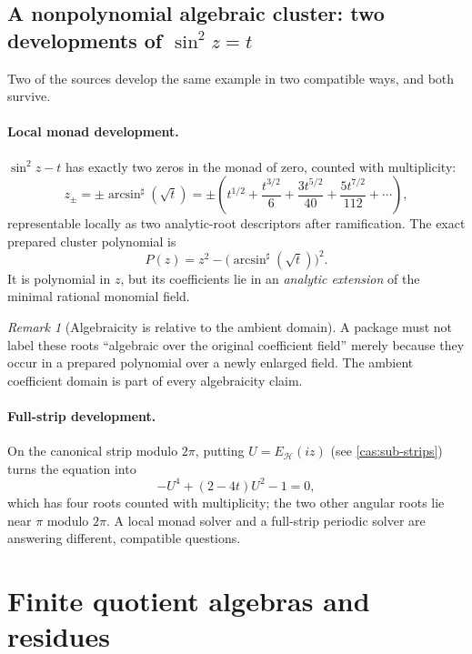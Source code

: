 \documentclass[11pt,letterpaper]{article}
\numberwithin{equation}{section}
\theoremstyle{definition}
\theoremstyle{remark}
\newtheorem{remark}[theorem]{Remark}
\newcommand{\HH}{\mathscr H}
\newcommand{\sh}{^{\sharp}}
\begin{document}
\subsection{A nonpolynomial algebraic cluster: two developments of \texorpdfstring{$\sin^2z=t$}{sin\textasciicircum 2 z = t}}
\label{cas:sub-sinsquared}
Two of the sources develop the same example in two compatible ways, and both
survive.

\paragraph{Local monad development.}
$\sin^2z-t$ has exactly two zeros in the monad of zero, counted with
multiplicity:
\[
 z_\pm=\pm\arcsin\sh(\sqrt t)
 =\pm\left(t^{1/2}+\frac{t^{3/2}}{6}+\frac{3t^{5/2}}{40}
 +\frac{5t^{7/2}}{112}+\cdots\right),
\]
representable locally as two analytic-root descriptors after ramification. The
exact prepared cluster polynomial is
\begin{equation}\label{cas:eq-prepared}
 P(z)=z^2-\bigl(\arcsin\sh(\sqrt t)\bigr)^2 .
\end{equation}
It is polynomial in $z$, but its coefficients lie in an \emph{analytic
extension} of the minimal rational monomial field.

\begin{remark}[Algebraicity is relative to the ambient domain]
\label{cas:rem-algebraicity}
A package must not label these roots ``algebraic over the original coefficient
field'' merely because they occur in a prepared polynomial over a newly enlarged
field. The ambient coefficient domain is part of every algebraicity claim.
\end{remark}

\paragraph{Full-strip development.}
On the canonical strip modulo $2\pi$, putting $U=E_{\HH}(iz)$ (see
\cref{cas:sub-strips}) turns the equation into
\begin{equation}\label{cas:eq-stripquartic}
 -U^4+(2-4t)U^2-1=0 ,
\end{equation}
which has four roots counted with multiplicity; the two other angular roots lie
near $\pi$ modulo $2\pi$. A local monad solver and a full-strip periodic solver
are answering different, compatible questions.

\section{Finite quotient algebras and residues}
\label{cas:sec-quotients}
\end{document}
